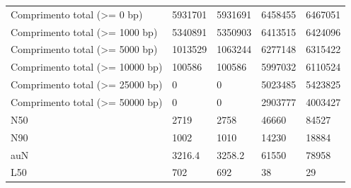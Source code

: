 \begin{table}[htb]
{\begin{tabular}{lllll}
		Comprimento total (\textgreater{}= 0 bp)     & 5931701                                & 5931691                                 & 6458455                           & 6467051                                                      \\
		Comprimento total (\textgreater{}= 1000 bp)  & 5340891                                & 5350903                                 & 6413515                           & 6424096                                                    \\
		Comprimento total (\textgreater{}= 5000 bp)  & 1013529                                & 1063244                                 & 6277148                           & 6315422                                                      \\
		Comprimento total (\textgreater{}= 10000 bp) & 100586                                 & 100586                                  & 5997032                           & 6110524                                                       \\
		Comprimento total (\textgreater{}= 25000 bp) & 0                                      & 0                                       & 5023485                           & 5423825                                                  \\
		Comprimento total (\textgreater{}= 50000 bp) & 0                                      & 0                                       & 2903777                           & 4003427                                                              \\
		N50                                          & 2719                                   & 2758                                    & 46660                             & 84527                                            \\
		N90                                          & 1002                                   & 1010                                    & 14230                             & 18884                                                   \\
		auN                                          & 3216.4                                 & 3258.2                                  & 61550                             & 78958                                                  \\
		L50                                          & 702                                    & 692                                     & 38                                & 29                                                             \\

\end{tabular}}
\end{table}
